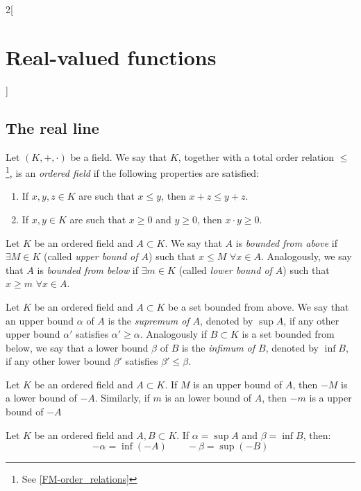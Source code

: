 \documentclass[../../../main.tex]{subfiles}
\begin{document}
\begin{multicols}{2}[\section{Real-valued functions}]
  \subsection{The real line}
  \begin{definition}
    Let $(K,+,\cdot)$ be a field. We say that $K$, together with a total order relation $\leq$\footnote{See \cref{FM-order_relations}}, is an \textit{ordered field} if the following properties are satisfied:
    \begin{enumerate}
      \item If $x,y,z\in K$ are such that $x\leq y$, then $x+z\leq y+z$.
      \item If $x,y\in K$ are such that $x\geq0$ and $y\geq0$, then $x\cdot y\geq 0$.
    \end{enumerate}
  \end{definition}
  \begin{definition}
    Let $K$ be an ordered field and $A\subset K$. We say that $A$ is \textit{bounded from above} if $\exists M\in K$ (called \textit{upper bound of $A$}) such that $x\leq M$ $\forall x\in A$. Analogously, we say that $A$ is \textit{bounded from below} if $\exists m\in K$ (called \textit{lower bound of $A$}) such that $x\geq m$ $\forall x\in A$.
  \end{definition}
  \begin{definition}
    Let $K$ be an ordered field and $A\subset K$ be a set bounded from above. We say that an upper bound $\alpha$ of $A$ is the \textit{supremum of $A$}, denoted by $\sup A$, if any other upper bound $\alpha'$ satisfies $\alpha'\geq\alpha$.
    Analogously if $B\subset K$ is a set bounded from below, we say that a lower bound $\beta$ of $B$ is the \textit{infimum of $B$}, denoted by $\inf B$, if any other lower bound $\beta'$ satisfies $\beta'\leq\beta$.
  \end{definition}
  \begin{prop}
    Let $K$ be an ordered field and $A\subset K$. If $M$ is an upper bound of $A$, then $-M$ is a lower bound of $-A$. Similarly, if $m$ is an lower bound of $A$, then $-m$ is a upper bound of $-A$
  \end{prop}
  \begin{prop}
    Let $K$ be an ordered field and $A,B\subset K$. If $\alpha=\sup A$ and $\beta=\inf B$, then: $$-\alpha=\inf(-A)\qquad-\beta=\sup(-B)$$

\end{prop}
\end{multicols}
\end{document}

